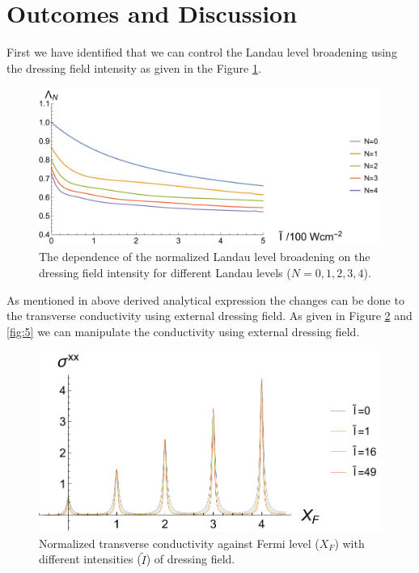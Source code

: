 \documentclass[a4paper]{article}
\numberwithin{equation}{subsection}
\numberwithin{equation}{section}
\begin{document}
\section*{Outcomes and Discussion}

First we have identified that we can control the Landau level broadening using the dressing field intensity as given in the Figure \ref{fig:3}.
\begin{figure}[ht!]
  \centering
  \includegraphics[scale=0.6]{figures/fig3.pdf}
  \caption{The dependence of the normalized Landau level broadening on the dressing field intensity for different Landau levels ($N=0,1,2,3,4$).}
  \label{fig:3}
\end{figure}

As mentioned in above derived analytical expression the changes can be done to the transverse conductivity using external dressing field. As given in Figure \ref{fig:4} and \ref{fig:5} we can manipulate the conductivity using external dressing field.

\begin{figure}[ht!]
  \centering
  \includegraphics[scale=1]{figures/fig4.pdf}
  \caption{Normalized transverse conductivity against Fermi level ($X_F$) with different intensities ($\tilde{I}$) of dressing field.}
  \label{fig:4}
\end{figure}
\end{document}

